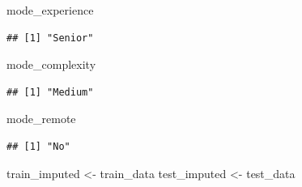 \documentclass[
]{article}
\newenvironment{Shaded}{\begin{snugshade}}{\end{snugshade}}
\newcommand{\FunctionTok}[1]{\textcolor[rgb]{0.13,0.29,0.53}{\textbf{#1}}}
\newcommand{\NormalTok}[1]{#1}
\newcommand{\OtherTok}[1]{\textcolor[rgb]{0.56,0.35,0.01}{#1}}
\newcommand{\SpecialCharTok}[1]{\textcolor[rgb]{0.81,0.36,0.00}{\textbf{#1}}}
\begin{document}
\begin{Shaded}
\end{Shaded}

\begin{Shaded}
\begin{Highlighting}[]
\NormalTok{mode\_experience}
\end{Highlighting}
\end{Shaded}

\begin{verbatim}
## [1] "Senior"
\end{verbatim}

\begin{Shaded}
\begin{Highlighting}[]
\NormalTok{mode\_complexity}
\end{Highlighting}
\end{Shaded}

\begin{verbatim}
## [1] "Medium"
\end{verbatim}

\begin{Shaded}
\begin{Highlighting}[]
\NormalTok{mode\_remote}
\end{Highlighting}
\end{Shaded}

\begin{verbatim}
## [1] "No"
\end{verbatim}

\begin{Shaded}
\begin{Highlighting}[]
\NormalTok{train\_imputed }\OtherTok{\textless{}{-}}\NormalTok{ train\_data}
\NormalTok{test\_imputed }\OtherTok{\textless{}{-}}\NormalTok{ test\_data}
\end{Highlighting}
\end{Shaded}
\end{document}

